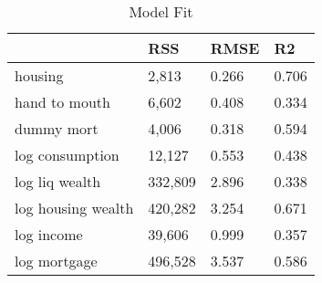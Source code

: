 \begin{table}[htbp]
\caption{\label{clabel} Model Fit}\centering\medskip
\begin{tabular}{llll} \hline \hline
 & RSS  & RMSE  & R2  \\  \hline 
housing &     2,813 &     0.266 &     0.706 \\  
hand to mouth &     6,602 &     0.408 &     0.334 \\  
dummy mort &     4,006 &     0.318 &     0.594 \\  
log consumption &    12,127 &     0.553 &     0.438 \\  
log liq wealth &   332,809 &     2.896 &     0.338 \\  
log housing wealth &   420,282 &     3.254 &     0.671 \\  
log income &    39,606 &     0.999 &     0.357 \\  
log mortgage &   496,528 &     3.537 &     0.586 \\  
\hline \hline \end{tabular}
\end{table}
